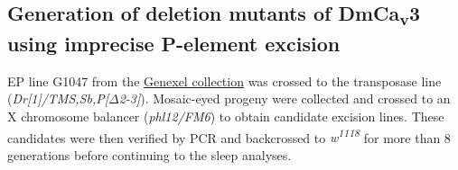 \subsection*{Generation of deletion mutants of DmCa\textsubscript{v}3 using imprecise P-element excision}

EP line G1047 from the \href{http://genexel.kaist.ac.kr}{Genexel collection} was crossed to the transposase line (\emph{Dr[1]/TMS,Sb,P[$\Delta$2-3]}). Mosaic-eyed progeny were collected and crossed to an X chromosome balancer (\emph{phl12/FM6}) to obtain candidate excision lines. These candidates were then verified by PCR and backcrossed to \emph{w\textsuperscript{1118}} for more than 8 generations before continuing to the sleep analyses.

